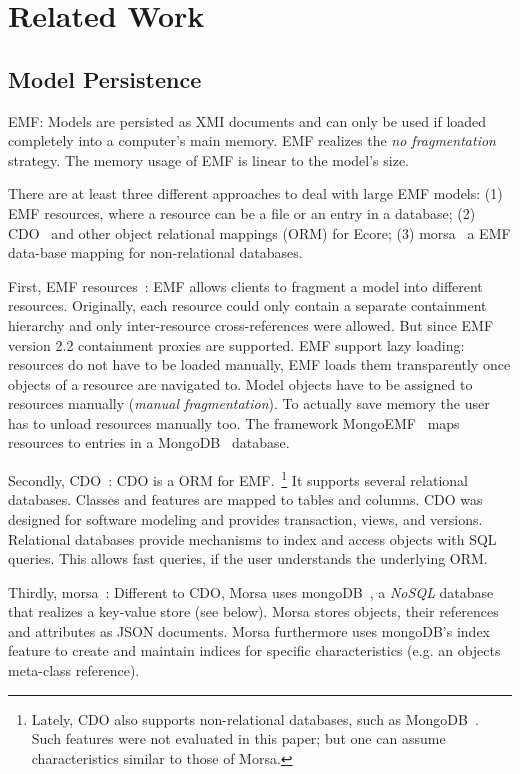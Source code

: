 \section{Related Work}
\label{sec:related_work}

\subsection{Model Persistence}
EMF: Models are persisted as XMI documents and can only be used if loaded completely into a computer's main memory. EMF realizes the \emph{no fragmentation} strategy. The memory usage of EMF is linear to the model's size.

There are at least three different approaches to deal with large EMF models: (1) EMF resources, where a resource can be a file or an entry in a database; (2) CDO~\cite{cdo} and other object relational mappings (ORM) for Ecore; (3) morsa~\cite{morsa2011} a EMF data-base mapping for non-relational databases.

First, EMF resources~\cite{emf2009}: EMF allows clients to fragment a model into different resources. Originally, each resource could only contain a separate containment hierarchy and only inter-resource cross-references were allowed. But since EMF version 2.2 containment proxies are supported. EMF support lazy loading: resources do not have to be loaded manually, EMF loads them transparently once objects of a resource are navigated to. Model objects have to be assigned to resources manually (\emph{manual fragmentation}). To actually save memory the user has to unload resources manually too. The framework MongoEMF~\cite{mongoEMF} maps resources to entries in a MongoDB~\cite{mongodb2010} database.

Secondly, CDO~\cite{cdo}: CDO is a ORM for EMF.~\footnote{Lately, CDO also supports non-relational databases, such as MongoDB~\cite{mongodb2010}. Such features were not evaluated in this paper; but one can assume characteristics similar to those of Morsa.}
It supports several relational databases. Classes and features are mapped to tables and columns. CDO was designed for software modeling and provides transaction, views, and versions.
Relational databases provide mechanisms to index and access objects with SQL queries. This allows fast queries, if the user understands the underlying ORM.

Thirdly, morsa~\cite{morsa2011}: Different to CDO, Morsa uses mongoDB~\cite{mongodb2010}, a \emph{NoSQL} database that realizes a key-value store (see below). Morsa stores objects, their references and attributes as JSON documents. Morsa furthermore uses mongoDB's index feature to create and maintain indices for specific characteristics (e.g. an objects meta-class reference).

